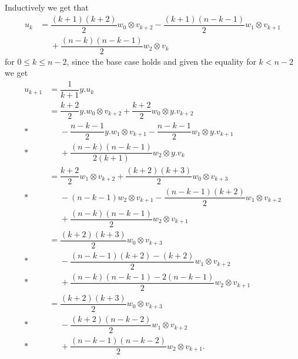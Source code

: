 Inductively we get that
\begin{align*}
  u_k &= \dfrac{(k+1)(k+2)}{2}w_0\otimes v_{k+2} - \dfrac{(k+1)(n-k-1)}{2}w_1\otimes v_{k+1} \\
  &\phantom{{}={}}{} + \dfrac{(n-k)(n-k-1)}{2}w_2\otimes v_k
\end{align*}
for $0\leq k\leq n-2$, since the base case holds and given the equality for $k<n-2$ we get
\begin{align*}
  u_{k+1} &= \dfrac{1}{k+1}y.u_k \\
          &= \dfrac{k+2}{2}y.w_0\otimes v_{k+2} + \dfrac{k+2}{2}w_0\otimes y.v_{k+2} \\*
          &\phantom{{}={}}{} - \dfrac{n-k-1}{2}y.w_1\otimes v_{k+1} - \dfrac{n-k-1}{2}w_1\otimes y.v_{k+1} \\*
          &\phantom{{}={}}{} + \dfrac{(n-k)(n-k-1)}{2(k+1)}w_2\otimes y.v_k \\
          &= \dfrac{k+2}{2}w_1\otimes v_{k+2} + \dfrac{(k+2)(k+3)}{2}w_0\otimes v_{k+3} \\*
          &\phantom{{}={}}{} - (n-k-1)w_2\otimes v_{k+1} - \dfrac{(n-k-1)(k+2)}{2}w_1\otimes v_{k+2} \\
          &\phantom{{}={}}{} + \dfrac{(n-k)(n-k-1)}{2}w_2\otimes v_{k+1} \\
          &= \dfrac{(k+2)(k+3)}{2}w_0\otimes v_{k+3} \\*
          &\phantom{{}={}}{} - \dfrac{(n-k-1)(k+2)-(k+2)}{2}w_1\otimes v_{k+2} \\*
          &\phantom{{}={}}{} + \dfrac{(n-k)(n-k-1)-2(n-k-1)}{2}w_2\otimes v_{k+1} \\
          &= \dfrac{(k+2)(k+3)}{2}w_0\otimes v_{k+3} \\*
          &\phantom{{}={}}{} - \dfrac{(k+2)(n-k-2)}{2}w_1\otimes v_{k+2} \\*
          &\phantom{{}={}}{} + \dfrac{(n-k-1)(n-k-2)}{2}w_2\otimes v_{k+1}.
\end{align*}


